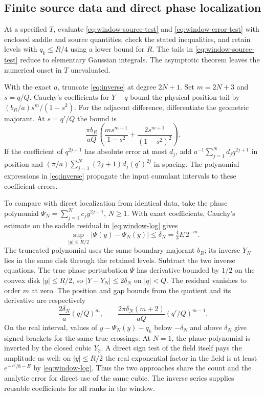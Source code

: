 \subsection{Finite source data and direct phase localization}
\label{sec:inverse-data}

At a specified \(T\), evaluate \eqref{eq:window-source-test} and
\eqref{eq:window-error-test} with enclosed saddle and source quantities,
check the stated inequalities, and retain levels with
\(q_k\le R/4\) using a lower bound for \(R\). The tails in
\eqref{eq:window-source-test} reduce to elementary Gaussian integrals.
The asymptotic theorem leaves the numerical onset in \(T\) unevaluated.

With the exact \(a\), truncate \eqref{eq:inverse} at degree \(2N+1\).
Set \(m=2N+3\) and \(s=q/Q\). Cauchy's coefficients for \(Y-q\)
bound the physical position tail by \((b_R/a)s^m/(1-s^2)\).
For the adjacent difference, differentiate the geometric majorant. At
\(s=q'/Q\) the bound is
\begin{equation}
 \frac{\pi b_R}{aQ}
  \left(\frac{m s^{m-1}}{1-s^2}
                       +\frac{2s^{m+1}}{(1-s^2)^2}\right).
 \label{eq:inverse-tail}
\end{equation}
If the coefficient of \(q^{2j+1}\) has absolute error at most \(d_j\),
add \(a^{-1}\sum_{j=1}^N d_j q^{2j+1}\) in position and
\((\pi/a)\sum_{j=1}^N(2j+1)d_j(q')^{2j}\) in spacing. The polynomial
expressions in \eqref{eq:inverse} propagate the input cumulant intervals
to these coefficient errors.

To compare with direct localization from identical data, take the phase
polynomial \(\Psi_N=\sum_{j=1}^N c_j y^{2j+1}\), \(N\ge1\).
With exact coefficients, Cauchy's estimate on the saddle residual
in \eqref{eq:window-log} gives
\[
 \sup_{|y|\le R/2}|\Psi(y)-\Psi_N(y)|
 \le \delta_N=\tfrac43 E\,2^{-m}.
\]
The truncated polynomial uses the same boundary majorant \(b_R\);
its inverse \(Y_N\) lies in the same disk through the retained levels.
Subtract the two inverse equations. The true phase perturbation
\(\Psi\) has derivative bounded by \(1/2\) on the convex disk
\(|y|\le R/2\), so \(|Y-Y_N|\le2\delta_N\) on \(|q|<Q\).
The residual vanishes to order \(m\) at zero. The position and gap
bounds from the quotient and its derivative are respectively
\[
 \frac{2\delta_N}{a}(q/Q)^m,\qquad
 \frac{2\pi\delta_N(m+2)}{aQ}(q'/Q)^{m-1}.
\]
On the real interval, values of \(y-\Psi_N(y)-q_k\) below
\(-\delta_N\) and above \(\delta_N\) give signed brackets for the
same true crossings. At \(N=1\), the phase polynomial is inverted by
the closed cubic \(Y_3\).
A direct sign test of the field itself pays the amplitude as well:
on \(|y|\le R/2\) the real exponential factor in the field is at least
\(e^{-r^2/8-E}\) by \eqref{eq:window-log}. Thus the two approaches share
the count and the analytic error for direct use of the same cubic.
The inverse series supplies reusable coefficients for all ranks in the
window.


